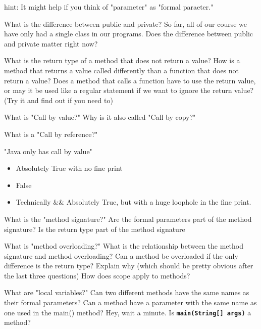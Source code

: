 \documentclass[letterpaper,11pt]{exam}
\begin{document}
\begin{questions}
hint: It might help if you think of "parameter" as "formal paraeter." 
\vspace{1cm}

\question What is the difference between public and private?
\question So far, all of our course we have only had a single class in our programs.  Does the difference between public and private matter right now?
\vspace{1cm}

\question What is the return type of a method that does not return a value?
\question How is a method that returns a value called differently than a function that does not return a value?
\vspace{1cm}
\question Does a method that calls a function have to use the return value, or may it be used like a regular statement if we want to ignore the return value?  (Try it and find out if you need to)

\question What is "Call by value?"  Why is it also called "Call by copy?"  

\question What is a "Call by reference?"  

\question "Java only has call by value"
\begin{itemize}
  \item  Absolutely True with no fine print
  \item  False
  \item Technically \&\& Absolutely True, but with a huge loophole in the fine print.
\end{itemize}


\question What is the "method signature?"
\vspace{1cm}
\question Are the formal parameters part of the method signature?
\question Is the return type part of the method signature

\question What is "method overloading?"
\vspace{1cm}
\question What is the relationship between the method signature and method overloading?
\vspace{1cm}
\question Can a method be overloaded if the only difference is the return type?  Explain why (which should be pretty obvious after the last three questions)
\vspace{1cm}
\question How does scope apply to methods?
\vspace{1cm}

\question What are "local variables?"
\vspace{1cm}
\question Can two different methods have the same names as their formal parameters?
\question Can a method have a parameter with the same name as one used in the main() method?
\question Hey, wait a minute.  Is \texttt{\textbf{main(String[] args)}} a method?
\end{questions}
\end{document}
